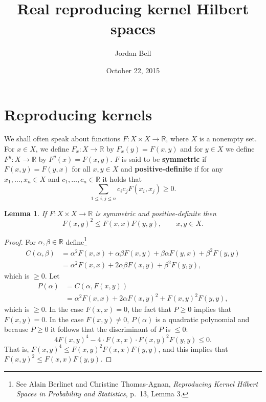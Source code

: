 \documentclass{article}
\newtheorem{lemma}[theorem]{Lemma}
\theoremstyle{definition}
\begin{document}
\title{Real reproducing kernel Hilbert spaces}
\author{Jordan Bell}
\date{October 22, 2015}

\maketitle

\section{Reproducing kernels}
We shall often speak about functions $F:X \times X \to \mathbb{R}$, where $X$ is a nonempty set. For $x \in X$, we define
$F_x:X \to \mathbb{R}$ by $F_x(y)=F(x,y)$ and for $y \in X$ we define $F^y:X \to \mathbb{R}$ by $F^y(x)=F(x,y)$. 
$F$ is said to be \textbf{symmetric} if
$F(x,y)=F(y,x)$ for all $x,y \in X$ and \textbf{positive-definite} if for any
$x_1,\ldots,x_n \in X$ and $c_1,\ldots,c_n \in \mathbb{R}$ it holds that
\[
\sum_{1 \leq i,j \leq n} c_i c_j F(x_i,x_j) \geq 0.
\]

\begin{lemma}
If $F:X \times X \to \mathbb{R}$ is symmetric and positive-definite then
\[
F(x,y)^2 \leq F(x,x) F(y,y),\qquad x,y \in X.
\]
\label{CS}
\end{lemma}
\begin{proof}
For $\alpha,\beta \in \mathbb{R}$
define\footnote{See 
Alain Berlinet and Christine Thomas-Agnan, {\em Reproducing Kernel Hilbert Spaces
in Probability and Statistics}, p.~13, Lemma 3.}
\begin{align*}
C(\alpha,\beta)&=\alpha^2 F(x,x) + \alpha \beta F(x,y) +  \beta \alpha F(y,x) + \beta^2 F(y,y)\\
&=\alpha^2 F(x,x) + 2\alpha \beta F(x,y) + \beta^2 F(y,y),
\end{align*}
which is $\geq 0$.
Let
\begin{align*}
P(\alpha) &= C(\alpha,F(x,y))\\
&=\alpha^2 F(x,x)+2\alpha F(x,y)^2 + F(x,y)^2 F(y,y),
\end{align*}
which is $\geq 0$. In the case $F(x,x)=0$, the fact that $P \geq 0$ implies that $F(x,y)=0$.
In the case $F(x,y) \neq 0$, $P(\alpha)$ is a quadratic polynomial and because $P \geq 0$ it follows that the  discriminant of $P$ is $\leq 0$:
\[
4F(x,y)^4 - 4\cdot F(x,x) \cdot F(x,y)^2 F(y,y) \leq 0.
\]
That is,  $F(x,y)^4 \leq F(x,y)^2 F(x,x) F(y,y)$, and this implies that
$F(x,y)^2 \leq F(x,x) F(y,y)$.
\end{proof}
\end{document}
